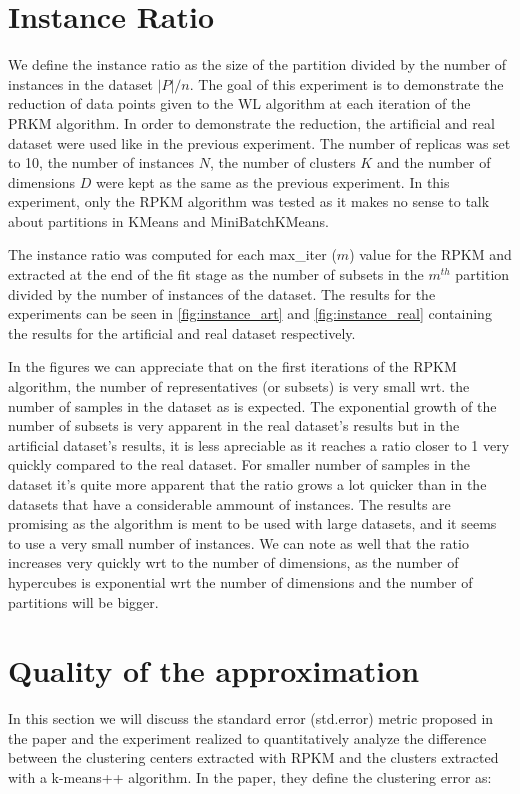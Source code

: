 \section{Instance Ratio}

We define the instance ratio as the size of the partition divided by the number of instances in the dataset $|P|/n$. The goal of this experiment is to demonstrate the reduction of data points given to the WL algorithm at each iteration of the PRKM algorithm. In order to demonstrate the reduction, the artificial and real dataset were used like in the previous experiment. The number of replicas was set to 10, the number of instances $N$, the number of clusters $K$ and the number of dimensions $D$ were kept as the same as the previous experiment. In this experiment, only the RPKM algorithm was tested as it makes no sense to talk about partitions in KMeans and MiniBatchKMeans.

The instance ratio was computed for each max\_iter ($m$) value for the RPKM and extracted at the end of the fit stage as the number of subsets in the $m^{th}$ partition divided by the number of instances of the dataset. The results for the experiments can be seen in \ref{fig:instance_art} and \ref{fig:instance_real} containing the results for the artificial and real dataset respectively.



In the figures we can appreciate that on the first iterations of the RPKM algorithm, the number of representatives (or subsets) is very small wrt. the number of samples in the dataset as is expected. The exponential growth of the number of subsets is very apparent in the real dataset's results but in the artificial dataset's results, it is less apreciable as it reaches a ratio closer to 1 very quickly compared to the real dataset. For smaller number of samples in the dataset it's quite more apparent that the ratio grows a lot quicker than in the datasets that have a considerable ammount of instances. The results are promising as the algorithm is ment to be used with large datasets, and it seems to use a very small number of instances. We can note as well that the ratio increases very quickly wrt to the number of dimensions, as the number of hypercubes is exponential wrt the number of dimensions and the number of partitions will be bigger.

\section{Quality of the approximation}
\label{section:qualitiy of the approximation}
In this section we will discuss the standard error (std.error) metric proposed in the paper and the experiment realized to quantitatively analyze the difference between the clustering centers extracted with RPKM and the clusters extracted with a k-means++ algorithm. In the paper, they define the clustering error as:

